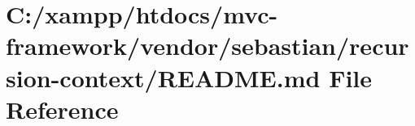 \hypertarget{vendor_2sebastian_2recursion-context_2_r_e_a_d_m_e_8md}{}\section{C\+:/xampp/htdocs/mvc-\/framework/vendor/sebastian/recursion-\/context/\+R\+E\+A\+D\+ME.md File Reference}
\label{vendor_2sebastian_2recursion-context_2_r_e_a_d_m_e_8md}
